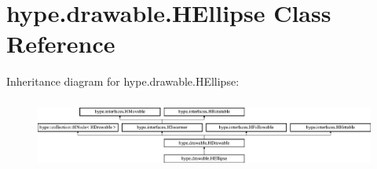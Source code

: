 \hypertarget{classhype_1_1drawable_1_1_h_ellipse}{\section{hype.\-drawable.\-H\-Ellipse Class Reference}
\label{classhype_1_1drawable_1_1_h_ellipse}
}
Inheritance diagram for hype.\-drawable.\-H\-Ellipse\-:\begin{figure}[H]
\begin{center}
\leavevmode
\includegraphics[height=2.333333cm]{classhype_1_1drawable_1_1_h_ellipse}
\end{center}
\end{figure}

